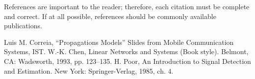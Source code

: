\documentclass[letterpaper, 10 pt, conference]{ieeeconf}  %
\begin{document}

References are important to the reader; therefore, each citation must be complete and correct. If at all possible, references should be commonly available publications.



\begin{thebibliography}{99}

 Luis M. Correia, ``Propagations Models'' 	Slides from Mobile Communication Systems, IST.
 W.-K. Chen, Linear Networks and Systems (Book style).	Belmont, CA: Wadsworth, 1993, pp. 123--135.
 H. Poor, An Introduction to Signal Detection and Estimation.   New York: Springer-Verlag, 1985, ch. 4.

\end{thebibliography}
\end{document}
